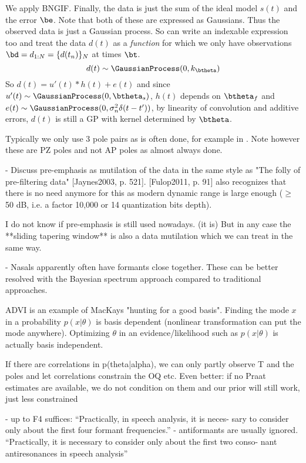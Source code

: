\begin{chaptersections}{%
We apply BNGIF.
}
Finally, the data is just the sum of the ideal model $s(t)$ and the error $\be$.
Note that both of these are expressed as Gaussians.
Thus the observed data is just a Gaussian process.
So can write an indexable expression too and treat the data $d(t)$ as a \emph{function} for which we only have observations $\bd = d_{1:N} = \{d(t_n)\}_N$ at times $\bt$.
\begin{equation}
    d(t) \sim \GaussianProcess(0,k_\btheta)
\end{equation}
So $d(t) = u'(t) * h(t) + e(t)$ and since $u'(t) \sim \GaussianProcess(0,\btheta_s)$, $h(t)$ depends on $\btheta_f$ and $e(t) \sim \GaussianProcess(0,\sigma_n^2 \delta(t-t'))$, by linearity of convolution and additive errors, $d(t)$ is still a GP with kernel determined by $\btheta$.

Typically we only use 3 pole pairs as is often done, for example in \citep{Wang2016a}.
Note however these are PZ poles and not AP poles as almost always done.


- Discuss pre-emphasis as mutilation of the data in the same style as "The
  folly of pre-filtering data" [Jaynes2003, p. 521]. [Fulop2011, p. 91] also
  recognizes that there is no need anymore for this as modern dynamic range is
  large enough ($\ge$ 50 dB, i.e. a factor 10,000 or 14 quantization bits depth).
  
  I do not know if pre-emphasis is still used nowadays. (it is) But in any case the
  **sliding tapering window** is also a data mutilation which we can treat in
  the same way.
  
- Nasals apparently often have formants close together. These can be better
  resolved with the Bayesian spectrum approach compared to traditional
  approaches.


ADVI is an example of MacKays "hunting for a good basis".
Finding the mode $x$ in a probability $p(x|\theta)$ is basis dependent (nonlinear transformation can put the mode anywhere).
Optimizing $\theta$ in an evidence/likelihood such as $p(x|\theta)$ is actually basis independent.

If there are correlations in p(theta|alpha), we can only partly observe T and the poles and let correlations constrain the OQ etc. Even better: if no Praat estimates are available, we do not condition on them and our prior will still work, just less constrained

- up to F4 suffices: ``Practically, in speech analysis, it is neces-
sary to consider only about the first four formant frequencies.'' \citep{Peterson1966}
- antiformants are usually ignored.
``Practically, it is necessary to consider only about the first two conso-
nant antiresonances in speech analysis'' \citep{Peterson1966}


\end{chaptersections}
